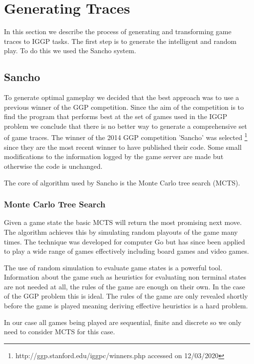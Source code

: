 \chapter{Generating Traces}\label{ch:traces}
In this section we describe the process of generating and transforming game traces to IGGP tasks. The first step is to generate the intelligent and random play. To do this we used the Sancho system\cite{Sancho/Github}. 

\section{Sancho}\label{sec:sancho}
To generate optimal gameplay we decided that the best approach was to use a previous winner of the GGP competition. Since the aim of the competition is to find the program that performs best at the set of games used in the IGGP problem we conclude that there is no better way to generate a comprehensive set of game traces. The winner of the 2014 GGP competition 'Sancho' was selected \footnote{http://ggp.stanford.edu/iggpc/winners.php accessed on 12/03/2020} since they are the most recent winner to have published their code\cite{Sancho/Github}. Some small modifications to the information logged by the game server are made but otherwise the code is unchanged.

The core of algorithm used by Sancho is the Monte Carlo tree search (MCTS).

\subsection{Monte Carlo Tree Search}
Given a game state the basic MCTS will return the most promising next move. The algorithm achieves this by simulating random playouts of the game many times. The technique was developed for computer Go but has since been applied to play a wide range of games effectively including board games and video games\cite{Silver/MCTS,Chaslot/MCTS}.

The use of random simulation to evaluate game states is a powerful tool. Information about the game such as heuristics for evaluating non terminal states are not needed at all, the rules of the game are enough on their own. In the case of the GGP problem this is ideal. The rules of the game are only revealed shortly before the game is played meaning deriving effective heuristics is a hard problem.

In our case all games being played are sequential, finite and discrete so we only need to consider MCTS for this case.

